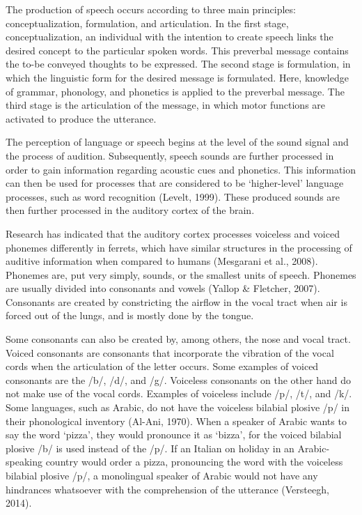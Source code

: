 The production of speech occurs according to three main principles: conceptualization, formulation, and articulation. In the first stage, conceptualization, an individual with the intention to create speech links the desired concept to the particular spoken words. This preverbal message contains the to-be conveyed thoughts to be expressed. The second stage is formulation, in which the linguistic form for the desired message is formulated. Here, knowledge of grammar, phonology, and phonetics is applied to the preverbal message. The third stage is the articulation of the message, in which motor functions are activated to produce the utterance. 

The perception of language or speech begins at the level of the sound signal and the process of audition. Subsequently, speech sounds are further processed in order to gain information regarding acoustic cues and phonetics. This information can then be used for processes that are considered to be ‘higher-level’ language processes, such as word recognition (Levelt, 1999). These produced sounds are then further processed in the auditory cortex of the brain. 

Research has indicated that the auditory cortex processes voiceless and voiced phonemes differently in ferrets, which have similar structures in the processing of auditive information when compared to humans (Mesgarani et al., 2008). Phonemes are, put very simply, sounds, or the smallest units of speech. Phonemes are usually divided into consonants and vowels (Yallop \& Fletcher, 2007). Consonants are created by constricting the airflow in the vocal tract when air is forced out of the lungs, and is mostly done by the tongue. 

Some consonants can also be created by, among others, the nose and vocal tract. Voiced consonants are consonants that incorporate the vibration of the vocal cords when the articulation of the letter occurs. Some examples of voiced consonants are the /b/, /d/, and /g/. Voiceless consonants on the other hand do not make use of the vocal cords. Examples of voiceless include /p/, /t/, and /k/. Some languages, such as Arabic, do not have the voiceless bilabial plosive /p/ in their phonological inventory (Al-Ani, 1970). When a speaker of Arabic wants to say the word ‘pizza’, they would pronounce it as ‘bizza’, for the voiced bilabial plosive /b/ is used instead of the /p/. If an Italian on holiday in an Arabic-speaking country would order a pizza, pronouncing the word with the voiceless bilabial plosive /p/, a monolingual speaker of Arabic would not have any hindrances whatsoever with the comprehension of the utterance (Versteegh, 2014). 


